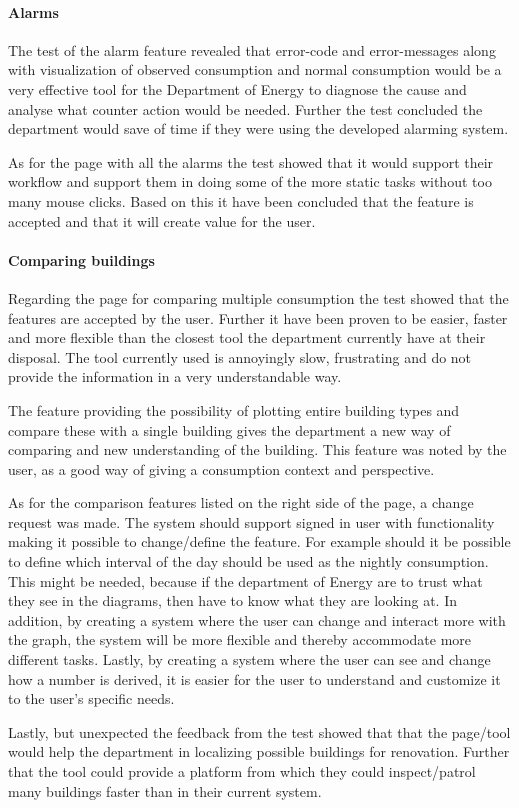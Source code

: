 \paragraph{Alarms}
The test of the alarm feature revealed that error-code and error-messages along with visualization of observed consumption and normal consumption would be a very effective tool for the Department of Energy to diagnose the cause and analyse what counter action would be needed. Further the test concluded the department would save of time if they were using the developed alarming system. 

As for the page with all the alarms the test showed that it would support their workflow and support them in doing some of the more static tasks without too many mouse clicks. Based on this it have been concluded that the feature is accepted and that it will create value for the user.
\paragraph{Comparing buildings}
Regarding the page for comparing multiple consumption the test showed that the features are accepted by the user. Further it have been proven to be easier, faster and more flexible than the closest tool the department currently have at their disposal. The tool currently used is annoyingly slow, frustrating and do not provide the information in a very understandable way. 

The feature providing the possibility of plotting entire building types and compare these with a single building gives the department a new way of comparing and new understanding of the building. This feature was noted by the user, as a good way of giving a consumption context and perspective. 

As for the comparison features listed on the right side of the page, a change request was made. The system should support signed in user with functionality making it possible to change/define the feature. For example should it be possible to define which interval of the day should be used as the nightly consumption. This might be needed, because if the department of Energy are to trust what they see in the diagrams, then have to know what they are looking at. In addition, by creating a system where the user can change and interact more with the graph, the system will be more flexible and thereby accommodate more different tasks. Lastly, by creating a system where the user can see and change how a number is derived, it is easier for the user to understand and customize it to the user's specific needs.

Lastly, but unexpected the feedback from the test showed that that the page/tool would help the department in localizing possible buildings for renovation. Further that the tool could provide a platform from which they could inspect/patrol many buildings faster than in their current system.